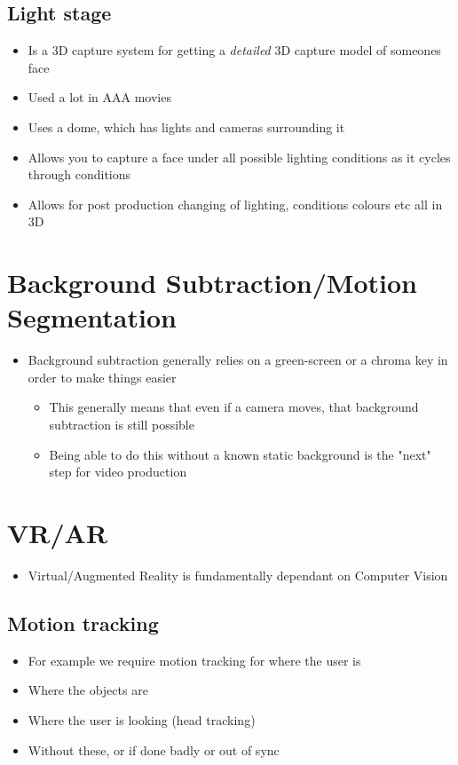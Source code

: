 \documentclass[a4paper]{article}
\begin{document}
\subsection{Light stage}
\label{sec-6-2}
\begin{itemize}
\item Is a 3D capture system for getting a \emph{detailed} 3D capture model of someones face
\item Used a lot in AAA movies
\item Uses a dome, which has lights and cameras surrounding it
\item Allows you to capture a face under all possible lighting conditions as it cycles through conditions
\item Allows for post production changing of lighting, conditions colours etc all in 3D
\end{itemize}
\section{Background Subtraction/Motion Segmentation}
\label{sec-7}
\begin{itemize}
\item Background subtraction generally relies on a green-screen or a chroma key in order to make things easier
\begin{itemize}
\item This generally means that even if a camera moves, that background subtraction is still possible
\item Being able to do this without a known static background is the "next" step for video production
\end{itemize}
\end{itemize}

\section{VR/AR}
\label{sec-8}
\begin{itemize}
\item Virtual/Augmented Reality is fundamentally dependant on Computer Vision
\end{itemize}
\subsection{Motion tracking}
\label{sec-8-1}
\begin{itemize}
\item For example we require motion tracking for where the user is
\item Where the objects are
\item Where the user is looking (head tracking)
\item Without these, or if done badly or out of sync
\end{itemize}
\end{document}
